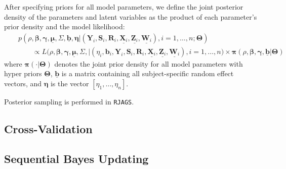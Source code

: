 \documentclass[12pt, letterpaper]{article}
\newcommand{\bmeta}{\boldsymbol{\eta}}
\newcommand{\bmbeta}{\boldsymbol{\beta}}
\newcommand{\bmpi}{\boldsymbol{\pi}}
\newcommand{\bmmu}{\boldsymbol{\mu}}
\newcommand{\bmgamma}{\boldsymbol{\gamma}}
\newcommand{\bmY}{\mathbf{Y}}
\newcommand{\bmZ}{\mathbf{Z}}
\newcommand{\bmX}{\mathbf{X}}
\newcommand{\bmW}{\mathbf{W}}
\newcommand{\bmR}{\mathbf{R}}
\newcommand{\bmS}{\mathbf{S}}
\newcommand{\bmb}{\mathbf{b}}
\newcommand{\bmTheta}{\boldsymbol{\Theta}}
\newcommand{\beas}{\begin{eqnarray*}}
\newcommand{\eeas}{\end{eqnarray*}}
\begin{document}
After specifying priors for all model parameters, we define the joint posterior density of the parameters and latent variables as the product of each parameter's prior density  and the model likelihood:
\beas
&& p(\rho, \bmbeta,\bmgamma, \underline{\bmmu}, \Sigma, \underline{\bmb}, \bmeta |  (\bmY_i, \bmS_i, \bmR_i,  \underline{\bmX_i}, \underline{\bmZ_i}, \underline{\bmW_i}), i=1,\dots,n; \bmTheta) \\
&&\qquad  \propto L\big(\rho, \bmbeta, \bmgamma,  \underline{\bmmu}, \Sigma,   | (\eta_i, \bmb_i, \bmY_i, \bmS_i, \bmR_i,  \underline{\bmX_i}, \underline{\bmZ_i}, \underline{\bmW_i}), i=1,\dots,n \big)\times \bmpi(\rho,\bmbeta, \bmgamma, \underline{\bmb}|\bmTheta)
\eeas
where $\bmpi(\cdot | \bmTheta)$ denotes the joint prior density for all model parameters with hyper priors $\bmTheta$, $\underline{\bmb}$ is a matrix containing all subject-specific random effect vectors, and $\bmeta$ is the vector $[\eta_1,\dots,\eta_n]$.

Posterior sampling is performed in \texttt{RJAGS}. 




\subsection{Cross-Validation}

\subsection{Sequential Bayes Updating}
\end{document}
